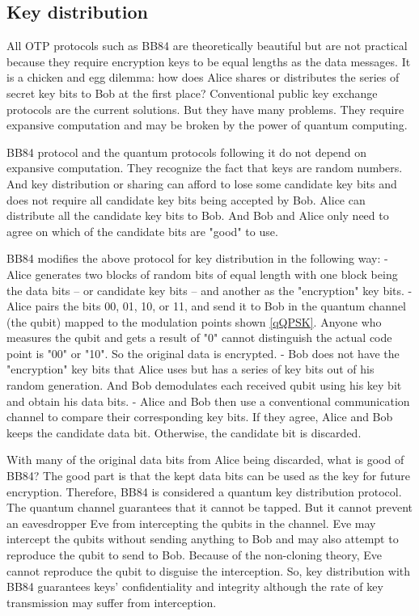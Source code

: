 \documentclass{book}
\begin{document}
\subsection{Key distribution}
All OTP protocols such as BB84 are theoretically beautiful but are not practical because they require encryption keys to be equal lengths as the data messages. It is a chicken and egg dilemma: how does Alice shares or distributes the series of secret key bits to Bob at the first place? Conventional public key exchange protocols are the current solutions. But they have many problems. They require expansive computation and may be broken by the power of quantum computing.

BB84 protocol and the quantum protocols following it do not depend on expansive computation. They recognize the fact that keys are random numbers. And key distribution or sharing can afford to lose some candidate key bits and does not require all candidate key bits being accepted by Bob. Alice can distribute all the candidate key bits to Bob. And Bob and Alice only need to agree on which of the candidate bits are "good" to use.

BB84 modifies the above protocol for key distribution in the following way:
- Alice generates two blocks of random bits of equal length with one block being the data bits -- or candidate key bits -- and another as the "encryption" key bits.
- Alice pairs the bits 00, 01, 10, or 11, and send it to Bob in the quantum channel (the qubit) mapped to the modulation points shown \ref{qQPSK}. Anyone who measures the qubit and gets a result of "0" cannot distinguish the actual code point is "00" or "10". So the original data is encrypted.
- Bob does not have the "encryption" key bits that Alice uses but has a series of key bits out of his random generation. And Bob demodulates each received qubit using his key bit and obtain his data bits.
- Alice and Bob then use a conventional communication channel to compare their corresponding key bits. If they agree, Alice and Bob keeps the candidate data bit. Otherwise, the candidate bit is discarded.

With many of the original data bits from Alice being discarded, what is good of BB84? The good part is that the kept data bits can be used as the key for future encryption. Therefore, BB84 is considered a quantum key distribution protocol. The quantum channel guarantees that it cannot be tapped. But it cannot prevent an eavesdropper Eve from intercepting the qubits in the channel. Eve may intercept the qubits without sending anything to Bob and may also attempt to reproduce the qubit to send to Bob. Because of the non-cloning theory, Eve cannot reproduce the qubit to disguise the interception. So, key distribution with BB84 guarantees keys' confidentiality and integrity although the rate of key transmission may suffer from interception.
\end{document}
